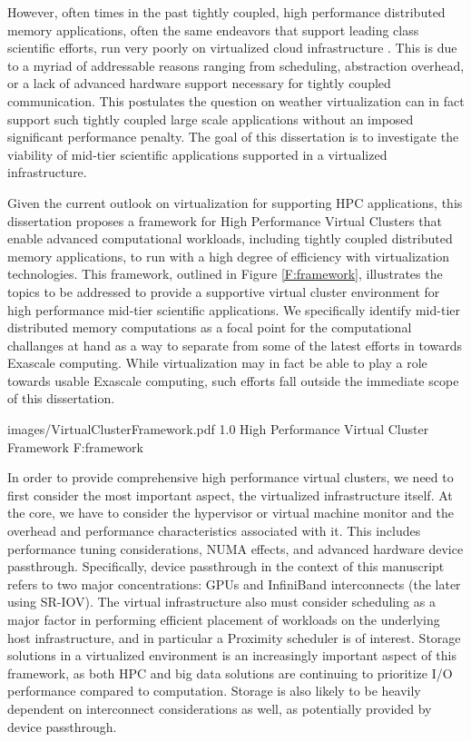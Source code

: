 However, often times in the past tightly coupled, high performance distributed memory applications, often the same endeavors that support leading class scientific efforts, run very poorly on virtualized cloud infrastructure \cite{ostermann2009performance}.  This is due to a myriad of addressable reasons ranging from scheduling, abstraction overhead, or a lack of advanced hardware support necessary for tightly coupled communication. This postulates the question on weather virtualization can in fact support such tightly coupled large scale applications without an imposed significant performance penalty. The goal of this dissertation is to investigate the viability of mid-tier scientific applications supported in a virtualized infrastructure.   



Given the current outlook on virtualization for supporting HPC applications, this dissertation proposes a framework for High Performance Virtual Clusters that enable advanced computational workloads, including tightly coupled distributed memory applications, to run with a high degree of efficiency with virtualization technologies. This framework, outlined in Figure \ref{F:framework}, illustrates the topics to be addressed to provide a supportive virtual cluster environment for high performance mid-tier scientific applications.  We specifically identify mid-tier distributed memory computations as a focal point for the computational challanges at hand as a way to separate from some of the latest efforts in towards Exascale \cite{dongarra2011exascale, bergman2008exascale, shalf2010exascale} computing.  While virtualization may in fact be able to play a role towards usable Exascale computing, such efforts fall outside the immediate scope of this dissertation. 

  {images/VirtualClusterFramework.pdf}
  {1.0}
  {High Performance Virtual Cluster Framework}
  {F:framework}

In order to provide comprehensive high performance virtual clusters, we need to first consider the most important aspect, the virtualized infrastructure itself. At the core, we have to consider the hypervisor or virtual machine monitor and the overhead and performance characteristics associated with it. This includes performance tuning considerations, NUMA effects, and advanced hardware device passthrough. Specifically, device passthrough in the context of this manuscript refers to two major concentrations: GPUs and InfiniBand interconnects (the later using SR-IOV). The virtual infrastructure also must consider scheduling as a major factor in performing efficient placement of workloads on the underlying host infrastructure, and in particular a Proximity scheduler is of interest. Storage solutions in a virtualized environment is an increasingly important aspect of this framework, as both HPC and big data solutions are continuing to prioritize I/O performance compared to computation. Storage is also likely to be heavily dependent on interconnect considerations as well, as potentially provided by device passthrough.  

